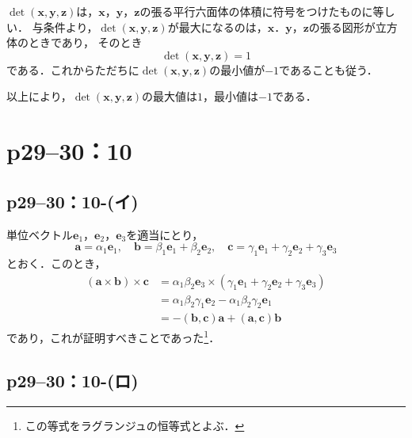 \begin{tanswer}
  $ \det (\bm{x},\bm{y},\bm{z})$は，$\bm{x}$，$\bm{y}$，$\bm{z}$の張る平行六面体の体積に符号をつけたものに等しい．
  与条件より，$\det (\bm{x},\bm{y},\bm{z})$が最大になるのは，$\bm{x}$．$\bm{y}$，$\bm{z}$の張る図形が立方体のときであり，
  そのとき
  \[
    \det (\bm{x},\bm{y},\bm{z}) =1
  \]
  である．これからただちに$\det (\bm{x},\bm{y},\bm{z})$の最小値が$-1$であることも従う．

  以上により，$\det (\bm{x},\bm{y},\bm{z})$の最大値は$1$，最小値は$-1$である．
\end{tanswer}

\section*{p29--30：10}

\subsection*{p29--30：10-(イ)}

\begin{tproof}
  単位ベクトル$\bm{e}_1$，$\bm{e}_2$，$\bm{e}_3$を適当にとり，
  \[
    \bm{a} = \alpha_1 \bm{e}_1,\quad \bm{b} = \beta_1 \bm{e}_1+\beta_2 \bm{e}_2,\quad \bm{c}= \gamma_1 \bm{e}_1 + \gamma_2 \bm{e}_2 + \gamma_3 \bm{e}_3
  \]
  とおく．このとき，
  \begin{align*}
    (\bm{a} \times \bm{b}) \times \bm{c} & = \alpha_1 \beta_2 \bm{e}_3 \times (\gamma_1 \bm{e}_1 + \gamma_2 \bm{e}_2 + \gamma_3 \bm{e}_3) \\
                                         & = \alpha_1 \beta_2 \gamma_1 \bm{e}_2 - \alpha_1 \beta_2 \gamma_2 \bm{e}_1                      \\
                                         & = -(\bm{b},\bm{c})\bm{a}+(\bm{a},\bm{c}) \bm{b}
  \end{align*}
  であり，これが証明すべきことであった\footnote{この等式をラグランジュの恒等式とよぶ．}．
\end{tproof}

\subsection*{p29--30：10-(ロ)}

